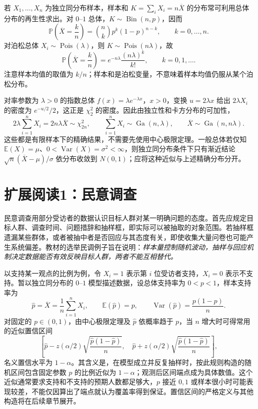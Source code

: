若 $X_1,\ldots,X_n$ 为独立同分布样本，样本和 $K=\sum_iX_i=n\overline X$ 的分布常可利用总体分布的再生性求出。对 $0$--$1$ 总体，$K\sim\operatorname{Bin}(n,p)$，因而
\[
  \mathbb P\left(\overline X=\frac kn\right)
    =\binom nk p^k(1-p)^{n-k},\qquad k=0,\ldots,n.
\]
对泊松总体 $X_i\sim\operatorname{Pois}(\lambda)$，则 $K\sim\operatorname{Pois}(n\lambda)$，故
\begin{equation}
  \mathbb P\left(\overline X=\frac kn\right)
    =e^{-n\lambda}\frac{(n\lambda)^k}{k!},\qquad k=0,1,\ldots.
  \label{eq:study-poisson-mean-law}
\end{equation}
注意样本均值的取值为 $k/n$；样本和是泊松变量，不意味着样本均值仍服从某个泊松分布。

对率参数为 $\lambda>0$ 的指数总体 $f(x)=\lambda e^{-\lambda x}$，$x>0$，变换 $u=2\lambda x$ 给出 $2\lambda X_i$ 的密度为 $e^{-u/2}/2$，这正是 $\chi^2_2$ 的密度。因此由独立性和卡方分布的可加性，
\begin{equation}
  2\lambda\sum_{i=1}^{n}X_i=2n\lambda\overline X\sim\chi^2_{2n},
  \qquad
  \sum_{i=1}^{n}X_i\sim\operatorname{Ga}(n,\lambda),\qquad
  \overline X\sim\operatorname{Ga}(n,n\lambda).
  \label{eq:study-exponential-sampling-law}
\end{equation}
这些都是有限样本下的精确结果，不需要先使用中心极限定理。一般总体若仅知 $\mathbb E(X)=\mu$、$0<\operatorname{Var}(X)=\sigma^2<\infty$，则独立同分布条件下只有渐近结论 $\sqrt n(\overline X-\mu)/\sigma$ 依分布收敛到 $N(0,1)$；应将这种近似与上述精确分布分开。

\section{扩展阅读1：民意调查}
\label{sec:study-opinion-polls}

民意调查用部分受访者的数据认识目标人群对某一明确问题的态度。首先应规定目标人群、调查时间、问题措辞和抽样框，即实际可以被抽取的对象范围。若抽样框遗漏某些群体，或者被抽中者是否回应与其态度有关，即使收集大量问卷也可能产生系统偏差。教材的选举民调例子旨在说明：\emph{样本量控制随机波动，抽样与回应机制决定数据能否有效反映目标人群，两者不能互相替代。}

以支持某一观点的比例为例，令 $X_i=1$ 表示第 $i$ 位受访者支持，$X_i=0$ 表示不支持。暂以独立同分布的 $0$--$1$ 模型描述数据，设总体支持率为 $0<p<1$，样本支持率为
\[
  \widehat p=\overline X=\frac1n\sum_{i=1}^{n}X_i,
  \qquad \mathbb E(\widehat p)=p,\qquad
  \operatorname{Var}(\widehat p)=\frac{p(1-p)}n.
\]
对固定的 $p\in(0,1)$，由中心极限定理及 $\widehat p$ 依概率趋于 $p$，当 $n$ 增大时可得常用的近似置信区间
\begin{equation}
  \left[\widehat p-z(\alpha/2)
                   \sqrt{\frac{\widehat p(1-\widehat p)}n},\quad
        \widehat p+z(\alpha/2)
                   \sqrt{\frac{\widehat p(1-\widehat p)}n}\right],
  \label{eq:study-poll-wald-interval}
\end{equation}
名义置信水平为 $1-\alpha$。其含义是，在模型成立并反复抽样时，按此规则构造的随机区间包含固定参数 $p$ 的比例近似为 $1-\alpha$；观测后区间端点成为具体数值。这个近似通常要求支持和不支持的预期人数都足够大，$p$ 接近 $0,1$ 或样本很小时可能表现较差，不能仅因算出了端点就认为覆盖率得到保证。置信区间的严格定义与其他构造将在后续章节展开。

